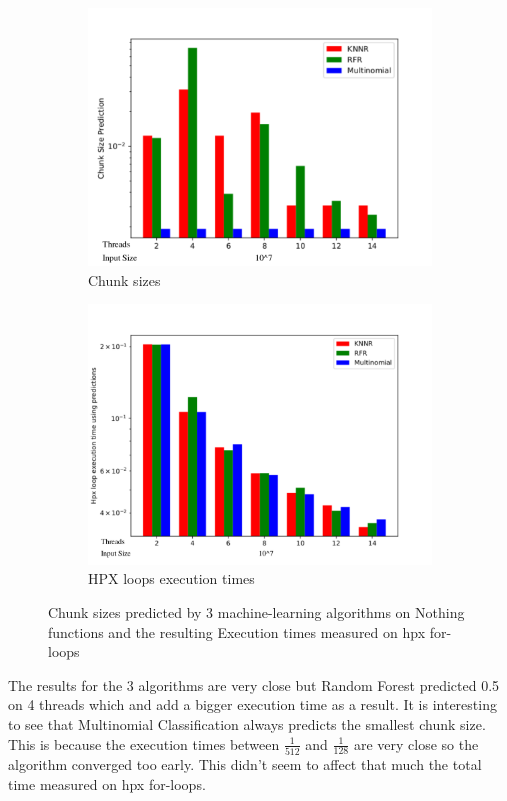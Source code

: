 \begin{figure}[h]
	\centering
	\begin{subfigure}[b]{0.5\textwidth}
		\centering
		\includegraphics[width=\textwidth]{images/bars_nothing_cs.pdf}
		\caption[Network2]%
		{{Chunk sizes}}    
	\end{subfigure}
	\hfill
	\begin{subfigure}[b]{0.49\textwidth}  
		\centering 
		\includegraphics[width=\textwidth]{images/bars_nothing_times.pdf}
		\caption[]%
		{{HPX loops execution times}}    
	\end{subfigure}
	\caption{Chunk sizes predicted by 3 machine-learning algorithms on Nothing functions and the resulting Execution times measured on hpx for-loops} 	
\end{figure}
The results for the 3 algorithms are very close but Random Forest predicted 0.5 on 4 threads which and add a bigger execution time as a result. It is interesting to see that Multinomial Classification always predicts the smallest chunk size. This is because the execution times between $\frac{1}{512}$ and $\frac{1}{128}$ are very close so the algorithm converged too early. This didn't seem to affect that much the total time measured on hpx for-loops.
\newpage
